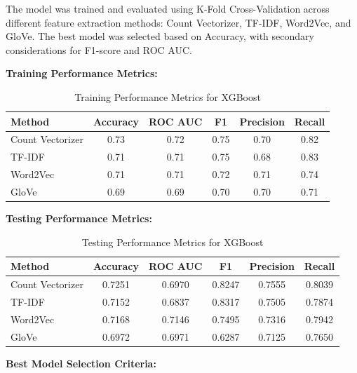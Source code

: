 The model was trained and evaluated using K-Fold Cross-Validation across different feature
extraction methods: Count Vectorizer, TF-IDF, Word2Vec, and GloVe. The best model was
selected based on Accuracy, with secondary considerations for F1-score and ROC AUC.

\textbf{Training Performance Metrics:}

\begin{table}[H]
    \centering
    \caption{Training Performance Metrics for XGBoost}
    \label{tab:lr-training-metrics}
    \begin{tabular}{|l|c|c|c|c|c|}
        \hline
        \textbf{Method} & \textbf{Accuracy} & \textbf{ROC AUC} & \textbf{F1} & \textbf{Precision} & \textbf{Recall} \\ 
        \hline
        Count Vectorizer & 0.73 & 0.72 & 0.75 & 0.70 & 0.82 \\ 
        \hline
        TF-IDF & 0.71 & 0.71 & 0.75 & 0.68 & 0.83 \\ 
        \hline
        Word2Vec & 0.71 & 0.71 & 0.72 & 0.71 & 0.74 \\ 
        \hline
        GloVe & 0.69 & 0.69 & 0.70 & 0.70 & 0.71 \\ 
        \hline
    \end{tabular}
\end{table}

\textbf{Testing Performance Metrics:}

\begin{table}[H]
    \centering
    \caption{Testing Performance Metrics for XGBoost}
    \label{tab:lr-testing-metrics}
    \begin{tabular}{|l|c|c|c|c|c|}
        \hline
        \textbf{Method} & \textbf{Accuracy} & \textbf{ROC AUC} & \textbf{F1} & \textbf{Precision} & \textbf{Recall} \\ 
        \hline
        Count Vectorizer & 0.7251 & 0.6970 & 0.8247 & 0.7555 & 0.8039 \\ 
        \hline
        TF-IDF & 0.7152 & 0.6837 & 0.8317 & 0.7505 & 0.7874 \\ 
        \hline
        Word2Vec & 0.7168 & 0.7146 & 0.7495 & 0.7316 & 0.7942 \\ 
        \hline
        GloVe & 0.6972 & 0.6971 & 0.6287 & 0.7125 & 0.7650 \\ 
        \hline
    \end{tabular}
\end{table}

\textbf{Best Model Selection Criteria:}

